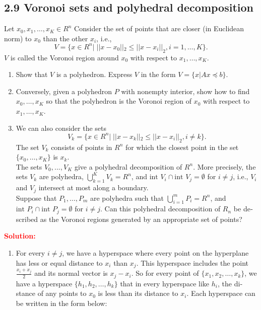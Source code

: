 \documentclass[a4paper]{article}
\begin{document}
\begin{latin}
\section{2.9 Voronoi sets and polyhedral decomposition}
Let $ x_{0}, x_{1}, \dots , x_{K} \in R^{n} $ Consider the set of
points that are closer (in Euclidean norm) to $ x_{0} $ than the other $ x_{i} $, i.e.,
\begin{equation*}
	V = \{x \in R^{n} | \; ||x - x_{0}||_{2} \leq ||x - x_{i}||_{2}, i = 1, \dots , K\}.
\end{equation*}
$ V $ is called the Voronoi region around $ x_{0} $ with respect to $ x_{1}, \dots , x_{K} $.
\begin{enumerate}
	\item Show that $ V $ is a polyhedron. Express $ V $ in the form $ V = \{x | Ax \preceq b\} $.
	\item Conversely, given a polyhedron $ P $ with nonempty interior, show how to find $ x_{0}, \dots , x_{K} $ so that the polyhedron is the Voronoi region of $ x_{0} $ with respect to $ x_{1}, \dots , x_{K} $.
	\item We can also consider the sets
	\begin{equation*}
		V_{k} = \{x \in R^{n}| \; ||x - x_{k}||_{2} \leq ||x - x_{i}||_{2}, i \neq k\}.
	\end{equation*}
	The set $ V_{k} $ consists of points in $ R^{n} $ for which the closest point in the set $ \{x_{0}, \dots , x_{K}\} $ is $ x_{k} $.
	\\
	The sets $ V_{0}, . . . , V_{K} $ give a polyhedral decomposition of $ R^{n} $. More precisely, the sets $ V_{k} $ are polyhedra, $ \bigcup_{k=1}^{K} V_{k} = R^{n} $, and  $ \text{int } V_{i} \cap \text{int } V_{j} = \emptyset $ for $ i \neq j $, i.e., $ V_{i} $ and $ V_{j} $ intersect at most along a boundary.
	\\
	Suppose that $ P_{1}, \dots , P_{m} $ are polyhedra such that $ \bigcup_{i=1}^{m} P_{i} = R^{n} $,  and  $ \text{int } P_{i} \cap \text{int } P_{j} = \emptyset $ for $ i \neq j $. Can this polyhedral decomposition of $ R_{n} $ be described as the Voronoi regions generated by an appropriate set of points?
\end{enumerate}
\textcolor{red}{\textbf{Solution:}}
\begin{enumerate}
	\item For every $ i \neq j $, we have a hyperspace where every point on the hyperplane has less or equal distance to $ x_{i} $ than $ x_{j} $. This hyperspace includes the point $ \frac{x_{i} + x_{j}}{2} $ and its normal vector is $ x_{j} - x_{i} $. So for every point of $ \{x_{1}, x_{2}, \dots, x_{k}\} $,  we have a hyperspace $ \{h_{1}, h_{2}, \dots, h_{k}\} $ that in every hyperspace like $ h_{i} $, the distance of any points to $ x_{0} $ is less than its distance to $ x_{i} $. Each hyperspace can be written in the form below:

\end{enumerate}
\end{latin}
\end{document}
